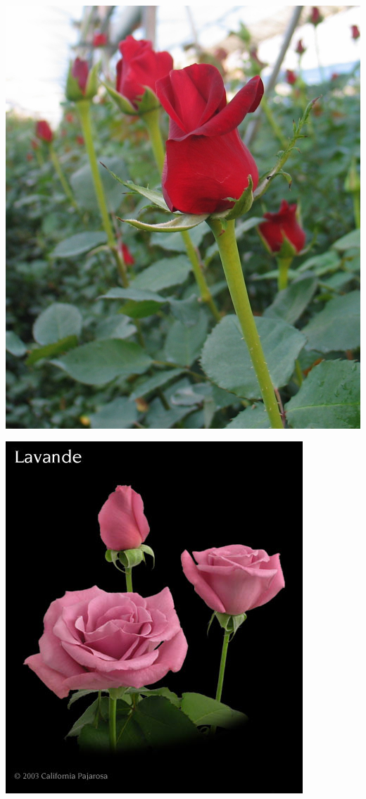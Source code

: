 \documentclass{article}
\begin{document}
\begin{center}
\includegraphics[height=0.9\textheight, angle=90]{../Rose_Kardinal.jpg}
\end{center}
\newpage

\begin{center}
\includegraphics[height=0.9\textheight, angle=90]{../Rose_Lavande.jpg}
\end{center}
\newpage
\end{document}
